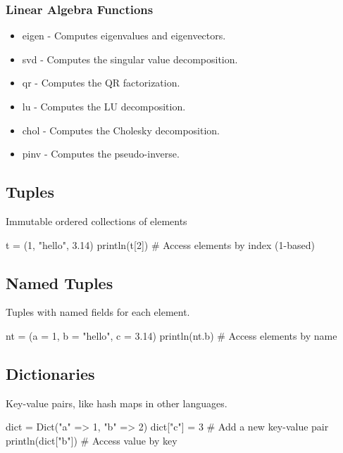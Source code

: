 \documentclass{report}
\begin{document}
    \bigbreak \noindent 
    \subsubsection{Linear Algebra Functions}
    \begin{itemize}
        \item eigen - Computes eigenvalues and eigenvectors.
        \item svd - Computes the singular value decomposition.
        \item qr - Computes the QR factorization.
        \item lu - Computes the LU decomposition.
        \item chol - Computes the Cholesky decomposition.
        \item pinv - Computes the pseudo-inverse.
    \end{itemize}

    \pagebreak 
    \bigbreak \noindent 
    \subsection{Tuples}
    \bigbreak \noindent 
    Immutable ordered collections of elements
    \bigbreak \noindent 
    \begin{jlcode}
        t = (1, "hello", 3.14)
        println(t[2])  # Access elements by index (1-based)
    \end{jlcode}

    \bigbreak \noindent 
    \subsection{Named Tuples}
    \bigbreak \noindent 
    Tuples with named fields for each element.
    \begin{jlcode}
    nt = (a = 1, b = "hello", c = 3.14)
    println(nt.b)  # Access elements by name
    \end{jlcode}

    \bigbreak \noindent 
    \subsection{Dictionaries}
    \bigbreak \noindent 
    Key-value pairs, like hash maps in other languages.
    \bigbreak \noindent 
    \begin{jlcode}
    dict = Dict("a" => 1, "b" => 2)
    dict["c"] = 3  # Add a new key-value pair
    println(dict["b"])  # Access value by key
    \end{jlcode}
\end{document}
